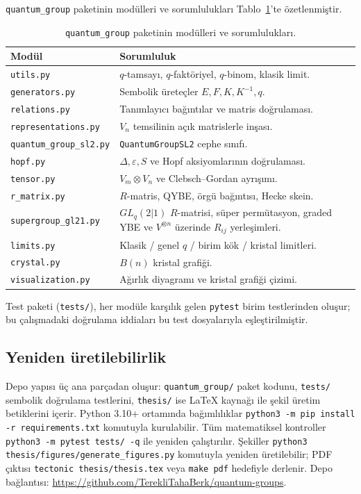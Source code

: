 \documentclass[10pt]{math}
\numberwithin{equation}{section}
\theoremstyle{plain}
\theoremstyle{definition}
\newcommand{\eps}{\varepsilon}
\newcommand{\cop}{\Delta}
\begin{document}
\texttt{quantum\_group} paketinin modülleri ve sorumlulukları
Tablo~\ref{tab:modules}'te özetlenmiştir.

\begin{table}[h]
\centering
\small
\caption{\texttt{quantum\_group} paketinin modülleri ve sorumlulukları.}
\label{tab:modules}
\begin{tabularx}{\textwidth}{@{}>{\raggedright\arraybackslash}p{}X@{}}
\toprule
Modül & Sorumluluk \\
\midrule
\texttt{utils.py} & $q$-tamsayı, $q$-faktöriyel, $q$-binom, klasik limit. \\
\texttt{generators.py} & Sembolik üreteçler $E, F, K, K^{-1}, q$. \\
\texttt{relations.py} & Tanımlayıcı bağıntılar ve matris doğrulaması. \\
\texttt{representations.py} & $V_n$ temsilinin açık matrislerle inşası. \\
\texttt{quantum\_group\_sl2.py} & \texttt{QuantumGroupSL2} cephe sınıfı. \\
\texttt{hopf.py} & $\cop, \eps, S$ ve Hopf aksiyomlarının doğrulaması. \\
\texttt{tensor.py} & $V_m \otimes V_n$ ve Clebsch--Gordan ayrışımı. \\
\texttt{r\_matrix.py} & $R$-matris, QYBE, örgü bağıntısı, Hecke skein. \\
\texttt{supergroup\_gl21.py} & $GL_q(2|1)$ $R$-matrisi, süper permütasyon, graded YBE ve $V^{\otimes n}$ üzerinde $R_{ij}$ yerleşimleri. \\
\texttt{limits.py} & Klasik / genel $q$ / birim kök / kristal limitleri. \\
\texttt{crystal.py} & $B(n)$ kristal grafiği. \\
\texttt{visualization.py} & Ağırlık diyagramı ve kristal grafiği çizimi. \\
\bottomrule
\end{tabularx}
\end{table}

Test paketi (\texttt{tests/}), her modüle karşılık gelen \texttt{pytest} birim
testlerinden oluşur; bu çalışmadaki doğrulama iddiaları bu test dosyalarıyla
eşleştirilmiştir.

\subsection{Yeniden üretilebilirlik}

Depo yapısı üç ana parçadan oluşur: \texttt{quantum\_group/} paket kodunu,
\texttt{tests/} sembolik doğrulama testlerini, \texttt{thesis/} ise LaTeX
kaynağı ile şekil üretim betiklerini içerir. Python 3.10+ ortamında bağımlılıklar
\texttt{python3 -m pip install -r requirements.txt} komutuyla kurulabilir. Tüm matematiksel
kontroller \texttt{python3 -m pytest tests/ -q} ile yeniden çalıştırılır.
Şekiller \texttt{python3 thesis/figures/generate\_figures.py} komutuyla
yeniden üretilebilir; PDF çıktısı \texttt{tectonic thesis/thesis.tex} veya
\texttt{make pdf} hedefiyle derlenir. Depo bağlantısı:
\url{https://github.com/TerekliTahaBerk/quantum-groups}.
\end{document}
